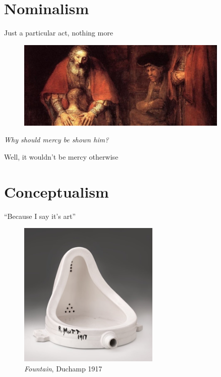 \documentclass[xcolor=dvipsnames]{beamer}
\begin{document}
\section{Nominalism}


\begin{frame}{Just a particular act, nothing more}
  \begin{figure}
    \centering
    \includegraphics[width=0.9\textwidth]{mercy-rembrandt}
  \end{figure}
  \emph{Why should mercy be shown him?} \vspace{2mm}

\indent \; \; Well, it wouldn't be mercy otherwise
\end{frame}


\section{Conceptualism}


\begin{frame}{``Because I say it's art''}
  \begin{figure}
    \centering
    \includegraphics[width=0.6\textwidth]{toilet-duchamp}
    \caption {\emph{Fountain}, Duchamp 1917}
  \end{figure}
\end{frame}
\end{document}
